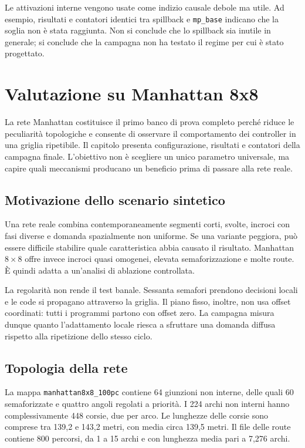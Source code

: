 \documentclass[12pt,a4paper,oneside]{report}
\numberwithin{equation}{chapter}
\begin{document}
Le attivazioni interne vengono usate come indizio causale debole ma utile. Ad
esempio, risultati e contatori identici tra spillback e \texttt{mp\_base} indicano che la
soglia non è stata raggiunta. Non si conclude che lo spillback sia inutile in
generale; si conclude che la campagna non ha testato il regime per cui è stato
progettato.

\chapter{Valutazione su Manhattan 8x8}
\label{chap:manhattan}

La rete Manhattan costituisce il primo banco di prova completo perché riduce
le peculiarità topologiche e consente di osservare il comportamento dei
controller in una griglia ripetibile. Il capitolo presenta configurazione,
risultati e contatori della campagna finale. L'obiettivo non è scegliere un unico
parametro universale, ma capire quali meccanismi producano un beneficio prima
di passare alla rete reale.

\section{Motivazione dello scenario sintetico}

Una rete reale combina contemporaneamente segmenti corti, svolte, incroci con
fasi diverse e domanda spazialmente non uniforme. Se una variante peggiora,
può essere difficile stabilire quale caratteristica abbia causato il risultato.
Manhattan $8\times8$ offre invece incroci quasi omogenei, elevata
semaforizzazione e molte route. È quindi adatta a un'analisi di ablazione
controllata.

La regolarità non rende il test banale. Sessanta semafori prendono decisioni
locali e le code si propagano attraverso la griglia. Il piano fisso, inoltre,
non usa offset coordinati: tutti i programmi partono con offset zero. La
campagna misura dunque quanto l'adattamento locale riesca a sfruttare una
domanda diffusa rispetto alla ripetizione dello stesso ciclo.

\section{Topologia della rete}

La mappa \texttt{manhattan8x8\_100pc} contiene 64 giunzioni non interne, delle
quali 60 semaforizzate e quattro angoli regolati a priorità. I 224 archi non
interni hanno complessivamente 448 corsie, due per arco. Le lunghezze delle
corsie sono comprese tra 139,2 e 143,2 metri, con media circa 139,5 metri. Il
file delle route contiene 800 percorsi, da 1 a 15 archi e con lunghezza media
pari a 7,276 archi.
\end{document}
